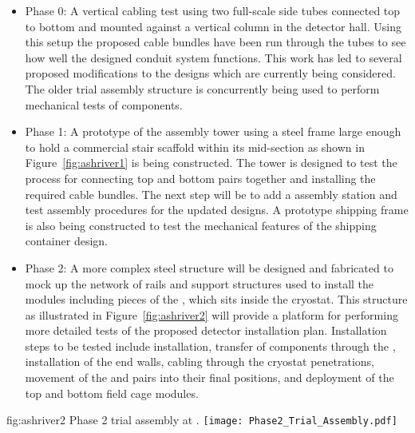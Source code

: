 \begin{itemize}
  \item {Phase 0:} A vertical cabling test using two full-scale 
          side tubes connected top to bottom and mounted 
         against a vertical column in the detector hall.  Using this 
         setup the proposed cable bundles have been run through the 
         tubes to see how well the designed conduit system functions.
         This work has led to several proposed modifications to the 
         designs which are currently being considered.  The older 
          trial assembly structure is concurrently 
         being used to perform mechanical tests of  
         components. 
  \item {Phase 1:} A prototype of the   
         assembly tower using a steel frame large enough to hold a 
         commercial stair scaffold within its mid-section as shown 
         in Figure~\ref{fig:ashriver1} is being constructed.  The 
         tower is designed to test the process for connecting top 
         and bottom  pairs together and installing the 
         required cable bundles.  The next step will be to add a
          assembly station and test assembly procedures 
         for the updated  designs.  A prototype 
          shipping frame is also being constructed to 
         test the mechanical features of the shipping container 
         design.  
  \item {Phase 2:} A more complex steel structure will be 
         designed and fabricated to mock up the network of rails 
         and support structures used to install the 
          modules including pieces of the , 
         which sits inside the cryostat.  This structure as 
         illustrated in Figure~\ref{fig:ashriver2} will provide 
         a platform for performing more detailed tests of the 
         proposed detector installation plan.  Installation steps 
         to be tested include  installation, transfer 
         of  components through the , 
         installation of the  end walls, cabling 
         through the cryostat penetrations, movement of the 
          and   pairs into their final 
         positions, and deployment of the top and bottom field 
         cage modules.
\end{itemize}
\begin{dunefigure}{fig:ashriver2}
  {Phase 2 trial assembly at .}
  \texttt{[image: Phase2\_Trial\_Assembly.pdf]}
\end{dunefigure}

